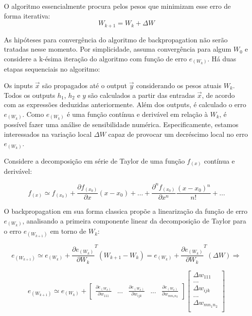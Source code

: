 \documentclass[
	12pt,				%
	oneside,			%
	a4paper,			%
	english,			%
	french,				%
	spanish,			%
	brazil,				%
	]{abntex2}
\begin{document}
O algoritmo essencialmente procura pelos pesos que minimizam esse erro de forma iterativa:
$$W_{k+1} = W_k + \Delta W$$

As hip\'oteses para converg\^encia do algoritmo de backpropagation n\~ao ser\~ao tratadas nesse momento. Por simplicidade, assuma converg\^encia para algum $W_0$ e considere a k-\'esima itera\c{c}\~ao do algoritmo com fun\c{c}\~ao de erro $e_{(W_k)}$. H\'a duas etapas sequenciais no algoritmo:

Os inputs $\vec{x}$ s\~ao propagados at\'e o output $\vec{y}$ considerando os pesos atuais $W_k$. Todos os outputs $h_1$, $h_2$ e $y$ s\~ao calculados a partir das entradas $\vec{x}$, de acordo com as express\~oes deduzidas anteriormente. Al\'em dos outputs, \'e calculado o erro $e_{(W_k)}$.  Como $e_{(W_k)}$ \'e uma fun\c{c}\~ao cont\'inua e deriv\'avel em rela\c{c}\~ao \`a $W_k$, \'e poss\'ivel fazer uma an\'alise de sensibilidade num\'erica. Especificamente, estamos interessados na varia\c{c}\~ao local $\Delta W$ capaz de provocar um decr\'escimo local no erro $e_{(W_k)}$.


Considere a decomposi\c{c}\~ao em s\'erie de Taylor de uma fun\c{c}\~ao $f_{(x)}$ cont\'inua e deriv\'avel:

$$f_{(x)} \simeq f_{(x_0)} + \frac{ \partial f_{(x_0)} } {\partial x} (x - x_0) + ... +
\frac{ \partial^n f_{(x_0)} } {\partial x^n} \frac{ (x - x_0)^n } { n! } + ...$$

O backpropagation em sua forma classica prop\~oe a lineariza\c{c}\~ao da fun\c{c}\~ao de erro $e_{(W_k)}$, analisando a primeira componente linear da decomposi\c{c}\~ao de Taylor para o erro $e_{(W_{k+1})}$ em torno de $W_{k}$:

$$e_{(W_{k+1})} \simeq e_{(W_{k})} + \frac{ \partial e_{(W_{k})} } { \partial W_k }^T (W_{k+1} - W_k)
= e_{(W_{k})} + \frac{ \partial e_{(W_{k})} } { \partial W_k }^T(\Delta W) \Rightarrow$$

$$e_{(W_{k+1})} \simeq e_{(W_{k})} + \begin{bmatrix}
\frac{ \partial e_{(W_{k})} } { \partial w_{111} } & ...
& \frac{ \partial e_{(W_{k})} } { \partial w_{ijk} } & ... & \frac{ \partial e_{(W_{k})} } { \partial w_{mn_1n_2} }

\end{bmatrix} \begin{bmatrix}
\Delta w_{111} \\
... \\
\Delta w_{ijk} \\
... \\
\Delta w_{mn_1n_2} \\

\end{bmatrix} $$
\end{document}
